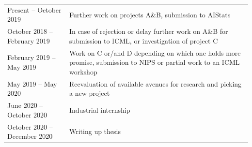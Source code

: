 \documentclass[12pt]{article}
\begin{document}
\begin{table}[h!]
\begin{tabular}{lp{11cm}}
Present -- October 2019         & Further work on projects A\&B, submission to AIStats \\
October 2018 -- February 2019   & In case of rejection or delay further work on A\&B for submission to ICML, or investigation of project C \\
February 2019 -- May 2019       & Work on C or/and D depending on which one holds more promise, submission to NIPS or partial work to an ICML workshop \\
May 2019 -- May 2020            & Reevaluation of available avenues for research and picking a new project \\
June 2020 -- October 2020       & Industrial internship \\
October 2020 -- December 2020   & Writing up thesis
\end{tabular}
\end{table}

\newpage 

 



% 
\end{document}
